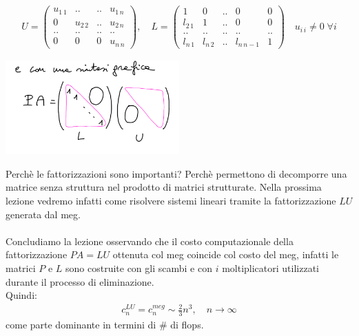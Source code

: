 \documentclass[12pt,a4paper]{article}
\begin{document}
\[ \begin{split}
	U=
		\begin{pmatrix}
		u_{1\,1} & .. & .. & u_{1\,n} \\
		0 & u_{2\,2} & .. & u_{2\,n} \\
		.. & .. & .. & .. \\
		0 & 0 & 0 & u_{n\,n}
		\end{pmatrix}
	, \quad L=
		\begin{pmatrix}
		1 & 0 & .. & 0 & 0 \\
		l_{2\,1} & 1 & .. & 0 & 0 \\
		.. & .. & .. & .. & .. \\
		l_{n\,1} & l_{n\,2} & .. & l_{n\,n-1} & 1 
		\end{pmatrix}
	\quad u_{i\,i} \neq 0 \; \forall i
\end{split} \]
\begin{center}
\includegraphics[width = 0.5\textwidth]{pag_19.png}
\end{center}
Perchè le fattorizzazioni sono importanti? Perchè permettono di decomporre una matrice senza struttura nel prodotto di matrici strutturate. Nella prossima lezione vedremo infatti come risolvere sistemi lineari tramite la fattorizzazione $LU$ generata dal meg.\\\\
Concludiamo la lezione osservando che il costo computazionale della fattorizzazione $PA=LU$ ottenuta col meg coincide col costo del meg, infatti le matrici $P$ e $L$ sono costruite con gli scambi e con $i$ moltiplicatori utilizzati durante il processo di eliminazione.\\
Quindi:
\[ \begin{split}
	c_n^{LU}=c_n^{meg}\sim\frac{2}{3}n^3, \quad n\to \infty
\end{split} \]
come parte dominante in termini di \# di flops.
\end{document}
